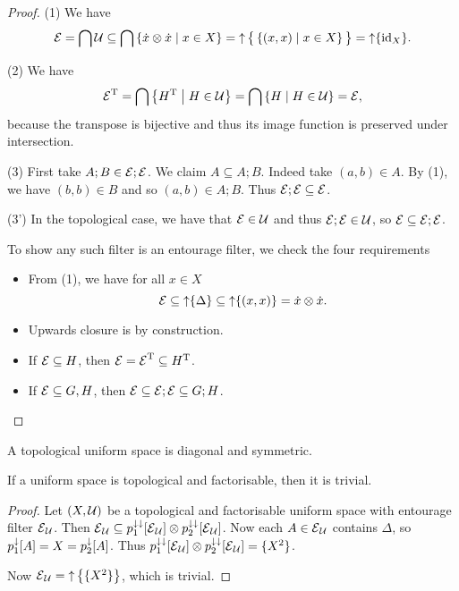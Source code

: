\begin{proof}
(1) We have
\[ \operatorname{\mathcal{E}} = \bigcap \mathcal{U} \subseteq \bigcap \left\{ \dot{x}\otimes \dot{x} \;\middle|\; x\in X \right\} = \operatorname{\uparrow}\big\{\left\{ (x,x) \;\middle|\; x\in X \right\}\big\} = \operatorname{\uparrow}\{\operatorname{id}_X\}. \]

(2) We have
\[ \operatorname{\mathcal{E}}^{\mathrm{T}} = \bigcap \left\{ H^{\mathrm{T}} \;\middle|\; H\in\mathcal{U} \right\} = \bigcap \left\{ H \;\middle|\; H\in\mathcal{U} \right\} = \operatorname{\mathcal{E}}, \]
because the transpose is bijective and thus its image function is preserved under intersection.

(3) First take $A;B \in\operatorname{\mathcal{E}};\operatorname{\mathcal{E}}$. We claim $A\subseteq A;B$. Indeed take $(a,b)\in A$. By (1), we have $(b,b)\in B$ and so $(a,b)\in A;B$. Thus $\operatorname{\mathcal{E}};\operatorname{\mathcal{E}} \subseteq \operatorname{\mathcal{E}}$.

(3') In the topological case, we have that $\operatorname{\mathcal{E}}\in\mathcal{U}$ and thus $\operatorname{\mathcal{E}};\operatorname{\mathcal{E}}\in \mathcal{U}$, so $\operatorname{\mathcal{E}} \subseteq \operatorname{\mathcal{E}};\operatorname{\mathcal{E}}$.

To show any such filter is an entourage filter, we check the four requirements
\begin{itemize}
\item From (1), we have for all $x\in X$
\[ \operatorname{\mathcal{E}} \subseteq \operatorname{\uparrow}\{\Delta\} \subseteq \operatorname{\uparrow}\{(x,x)\} = \dot{x}\otimes\dot{x}. \]
\item Upwards closure is by construction.
\item If $\operatorname{\mathcal{E}} \subseteq H$, then $\operatorname{\mathcal{E}} = \operatorname{\mathcal{E}}^{\mathrm{T}} \subseteq H^{\mathrm{T}}$.
\item If $\operatorname{\mathcal{E}}\subseteq G,H$, then $\operatorname{\mathcal{E}} \subseteq \operatorname{\mathcal{E}};\operatorname{\mathcal{E}} \subseteq G;H$.
\end{itemize}
\end{proof}
\begin{corollary}
A topological uniform space is diagonal and symmetric.
\end{corollary}

\begin{proposition}
If a uniform space is topological and factorisable, then it is trivial.
\end{proposition}
\begin{proof}
Let $\left( X,\mathcal{U} \right)$ be a topological and factorisable uniform space with entourage filter $\operatorname{\mathcal{E}}_\mathcal{U}$. Then $\operatorname{\mathcal{E}}_\mathcal{U} \subseteq p_1^{\downarrow\downarrow}[\operatorname{\mathcal{E}}_\mathcal{U}]\otimes p_2^{\downarrow\downarrow}[\operatorname{\mathcal{E}}_\mathcal{U}]$. Now each $A\in \operatorname{\mathcal{E}}_\mathcal{U}$ contains $\Delta$, so $p_1^\downarrow[A] = X = p_2^\downarrow[A]$. Thus $p_1^{\downarrow\downarrow}[\operatorname{\mathcal{E}}_\mathcal{U}]\otimes p_2^{\downarrow\downarrow}[\operatorname{\mathcal{E}}_\mathcal{U}] = \{X^2\}$.

Now $\operatorname{\mathcal{E}}_\mathcal{U} = \operatorname{\uparrow}\big\{\{X^2\}\big\}$, which is trivial.
\end{proof}

